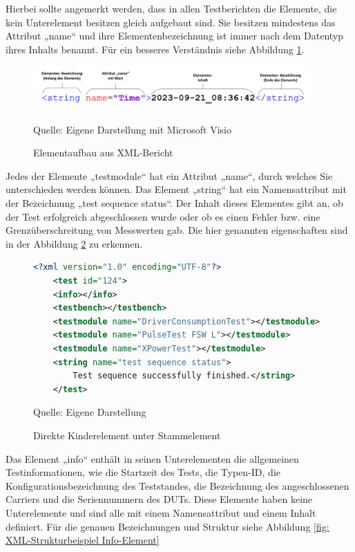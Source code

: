Hierbei sollte angemerkt werden, dass in allen Testberichten die Elemente, die kein Unterelement besitzen gleich aufgebaut sind.
Sie besitzen mindestens das Attribut „name“ und ihre Elementenbezeichnung ist immer nach dem Datentyp ihres Inhalts benannt.
Für ein besseres Verständnis siehe Abbildung \ref{fig: Elementaufbau aus XML-Bericht}.


\begin{figure}[H]
    \centering
    \includegraphics[width=0.95\textwidth]{Grafiken/Elementaufbau}
    \caption{Elementaufbau aus XML-Bericht}
    \label{fig: Elementaufbau aus XML-Bericht}
    {Quelle: Eigene Darstellung mit Microsoft Visio}
\end{figure}

Jedes der Elemente „testmodule“ hat ein Attribut
„name“, durch welches Sie unterschieden werden können. Das Element „string“ hat
ein Namensattribut mit der Bezeichnung „test sequence status“. Der Inhalt
dieses Elementes gibt an, ob der Test erfolgreich abgeschlossen wurde oder ob
es einen Fehler bzw. eine Grenzüberschreitung von Messwerten gab.
Die hier genannten eigenschaften sind in der Abbildung \ref{fig: Direkte Kinderelement unter Stammelement} zu erkennen.

\begin{figure}[H]
\centering
\begin{minipage}{0.95\textwidth}
\begin{lstlisting}[language=XML]
<?xml version="1.0" encoding="UTF-8"?>
    <test id="124">
    <info></info>
    <testbench></testbench>
    <testmodule name="DriverConsumptionTest"></testmodule>
    <testmodule name="PulseTest FSW L"></testmodule>
    <testmodule name="XPowerTest"></testmodule>
    <string name="test sequence status">
        Test sequence successfully finished.</string>
    </test>
\end{lstlisting}
\end{minipage}
\caption{Direkte Kinderelement unter Stammelement}
\label{fig: Direkte Kinderelement unter Stammelement}
    {Quelle: Eigene Darstellung}
\end{figure}


Das Element „info“ enthält in seinen Unterelementen die allgemeinen Testinformationen, wie die Startzeit des Tests,
die Typen-ID, die Konfigurationsbezeichnung des Teststandes, die Bezeichnung des angeschlossenen Carriers und die
Seriennummern des \ac{DUTs}. Diese Elemente haben keine Unterelemente und sind alle mit einem Namensattribut und einem Inhalt definiert.
Für die genauen Bezeichnungen und Struktur siehe Abbildung \ref{fig: XML-Strukturbeispiel Info-Element}

